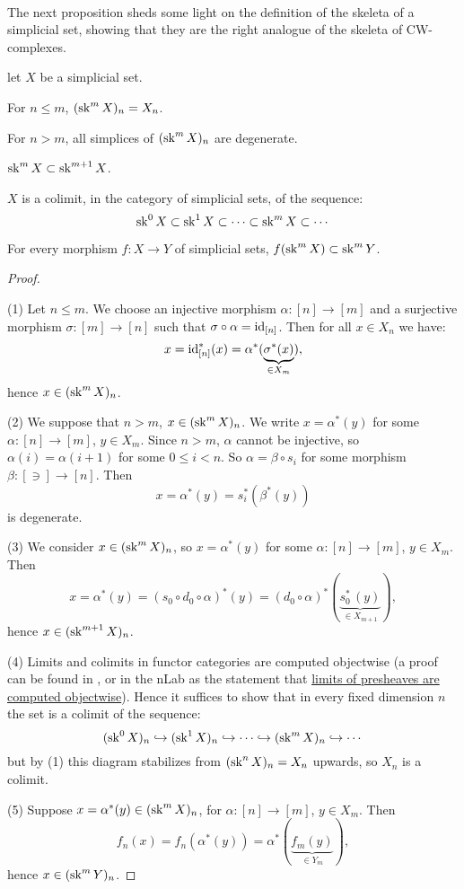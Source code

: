
\ 


The next proposition sheds some light on the definition of the skeleta of a simplicial set, showing that they are the right analogue of the skeleta of CW-complexes.

\begin{proposition}\label{proposition:getting-to-know-the-simplicial-skeleton}
let $X$ be a simplicial set.
\begin{numerate}
\item For $n\le m$, $(\operatorname{sk}^m X)_n=X_n$.
\item For $n>m$, all simplices of $(\operatorname{sk}^m X)_n$ are degenerate.
\item $\operatorname{sk}^m X\subset \operatorname{sk}^{m+1} X$.
\item $X$ is a colimit, in the category of simplicial sets, of the sequence:
\[\operatorname{sk}^0 X\subset \operatorname{sk}^1 X\subset\cdots\subset \operatorname{sk}^m X\subset\cdots\]
\item For every morphism $f:X\to Y$ of simplicial sets, $f(\operatorname{sk}^m X)\subset\operatorname{sk}^m Y$.
\end{numerate}
\end{proposition}

\begin{proof}\ 

(1) Let $n\le m$. We choose an injective morphism $\alpha:[n]\to[m]$ and a surjective morphism $\sigma:[m]\to[n]$ such that $\sigma\circ\alpha=\operatorname{id}_{[n]}$. Then for all $x\in X_n$ we have:
\[x=\operatorname{id}_{[n]}^*(x)=\alpha^*(\underbrace{\sigma^*(x)}_{\in X_m}),\]
hence $x\in(\operatorname{sk}^m X)_n$.

(2) We suppose that $n>m$, $x\in (\operatorname{sk}^m X)_n$. We write $x=\alpha^*(y)$ for some $\alpha:[n]\to[m]$, $y\in X_m$. Since $n>m$, $\alpha$ cannot be injective, so $\alpha(i)=\alpha(i+1)$ for some $0\le i<n$. So $\alpha=\beta\circ s_i$ for some morphism $\beta:[\ni]\to[n]$. Then
\[x=\alpha^*(y)=s_i^*(\beta^*(y))\]
is degenerate.

(3) We consider $x\in(\operatorname{sk}^m X)_n$, so $x=\alpha^*(y)$ for some $\alpha:[n]\to[m]$, $y\in X_m$. Then
\[x=\alpha^*(y)=(s_0\circ d_0\circ\alpha)^*(y)=(d_0\circ\alpha)^*(\underbrace{s_0^*\,(y)}_{\in X_{m+1}}),\]
hence $x\in(\operatorname{sk}^{m+1} X)_n$.

(4) Limits and colimits in functor categories are computed objectwise (a proof can be found in \cite[Theorem V.5.1]{maclane:71}, or in the nLab as the statement that \href{http://nlab-pages.s3.us-east-2.amazonaws.com/nlab/show/limits+of+presheaves+are+computed+objectwise}{limits of presheaves are computed objectwise}). Hence it suffices to show that in every fixed dimension $n$ the set is a colimit of the sequence:
\[(\operatorname{sk}^0 X)_n\hookrightarrow (\operatorname{sk}^1 X)_n\hookrightarrow\cdots\hookrightarrow (\operatorname{sk}^m X)_n\hookrightarrow\cdots\]
but by (1) this diagram stabilizes from $(\operatorname{sk}^n X)_n=X_n$ upwards, so $X_n$ is a colimit.

(5) Suppose $x=\alpha^*(y)\in(\operatorname{sk}^m X)_n$, for $\alpha:[n]\to[m]$, $y\in X_m$. Then
\[f_n(x)=f_n(\alpha^*(y))=\alpha^*(\underbrace{f_m(y)}_{\in Y_m}),\]
hence $x\in(\operatorname{sk}^m Y)_n$.
\end{proof}

